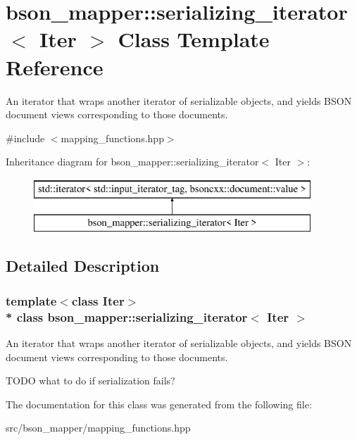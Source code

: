 \hypertarget{classbson__mapper_1_1serializing__iterator}{}\section{bson\+\_\+mapper\+:\+:serializing\+\_\+iterator$<$ Iter $>$ Class Template Reference}
\label{classbson__mapper_1_1serializing__iterator}


An iterator that wraps another iterator of serializable objects, and yields B\+S\+ON document views corresponding to those documents.  




{\ttfamily \#include $<$mapping\+\_\+functions.\+hpp$>$}

Inheritance diagram for bson\+\_\+mapper\+:\+:serializing\+\_\+iterator$<$ Iter $>$\+:\begin{figure}[H]
\begin{center}
\leavevmode
\includegraphics[height=2.000000cm]{classbson__mapper_1_1serializing__iterator}
\end{center}
\end{figure}


\subsection{Detailed Description}
\subsubsection*{template$<$class Iter$>$\\*
class bson\+\_\+mapper\+::serializing\+\_\+iterator$<$ Iter $>$}

An iterator that wraps another iterator of serializable objects, and yields B\+S\+ON document views corresponding to those documents. 

T\+O\+DO what to do if serialization fails? 

The documentation for this class was generated from the following file\+:\begin{DoxyCompactItemize}
\item 
src/bson\+\_\+mapper/mapping\+\_\+functions.\+hpp\end{DoxyCompactItemize}
